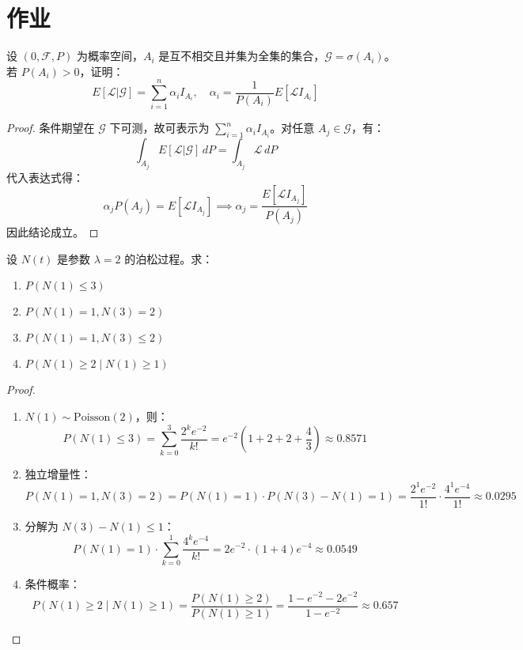 \documentclass[lang=cn,10pt,thmcnt=section]{elegantbook}
\begin{document}
\section{作业}
\begin{example}
	设 \( (0, \mathcal{F}, P) \) 为概率空间，\( A_i \) 是互不相交且并集为全集的集合，\( \mathcal{G} = \sigma(A_i) \)。若 \( P(A_i) > 0 \)，证明：
\[
E[\mathcal{L}|\mathcal{G}] = \sum_{i=1}^{n} \alpha_i I_{A_i}, \quad \alpha_i = \frac{1}{P(A_i)} E[\mathcal{L}I_{A_i}]
\]
\end{example}
\begin{proof}
	条件期望在 \( \mathcal{G} \) 下可测，故可表示为 \( \sum_{i=1}^{n} \alpha_i I_{A_i} \)。对任意 \( A_j \in \mathcal{G} \)，有：
\[
\int_{A_j} E[\mathcal{L}|\mathcal{G}] \, dP = \int_{A_j} \mathcal{L} \, dP
\]
代入表达式得：
\[
\alpha_j P(A_j) = E[\mathcal{L}I_{A_j}] \implies \alpha_j = \frac{E[\mathcal{L}I_{A_j}]}{P(A_j)}
\]
因此结论成立。
\end{proof}
\begin{example}
	设 \( N(t) \) 是参数 \( \lambda = 2 \) 的泊松过程。求：
\begin{enumerate}
    \item \( P(N(1) \leq 3) \)
    \item \( P(N(1) = 1, N(3) = 2) \)
    \item \( P(N(1) = 1, N(3) \leq 2) \)
    \item \( P(N(1) \geq 2 \mid N(1) \geq 1) \)
\end{enumerate}
\end{example}
\begin{proof}
	\begin{enumerate}
		\item \( N(1) \sim \text{Poisson}(2) \)，则：
		\[
		P(N(1) \leq 3) = \sum_{k=0}^{3} \frac{2^k e^{-2}}{k!} = e^{-2} \left(1 + 2 + 2 + \frac{4}{3}\right) \approx 0.8571
		\]
		\item 独立增量性：
		\[
		P(N(1)=1, N(3)=2) = P(N(1)=1) \cdot P(N(3)-N(1)=1) = \frac{2^1 e^{-2}}{1!} \cdot \frac{4^1 e^{-4}}{1!} \approx 0.0295
		\]
		\item 分解为 \( N(3)-N(1) \leq 1 \)：
		\[
		P(N(1)=1) \cdot \sum_{k=0}^{1} \frac{4^k e^{-4}}{k!} = 2e^{-2} \cdot (1 + 4)e^{-4} \approx 0.0549
		\]
		\item 条件概率：
		\[
		P(N(1) \geq 2 \mid N(1) \geq 1) = \frac{P(N(1) \geq 2)}{P(N(1) \geq 1)} = \frac{1 - e^{-2} - 2e^{-2}}{1 - e^{-2}} \approx 0.657
		\]
	\end{enumerate}
\end{proof}
\end{document}
